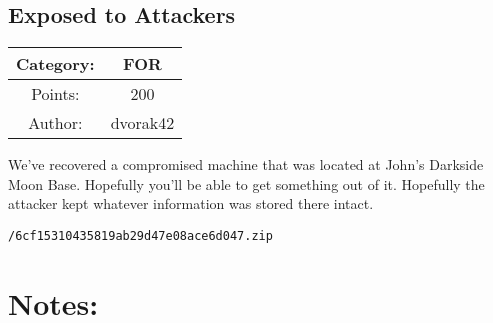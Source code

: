 \begin{center}
\section*{Exposed to Attackers}
{\large
\begin{tabular}{| c c |}
\hline
Category: & FOR\\\hline
Points: & 200\\\hline
Author: & dvorak42\\\hline
\end{tabular}
}
\end{center}
\vspace{0.5in}

{\large
We've recovered a compromised machine that was located at John's Darkside Moon Base. Hopefully you'll be able to get something out of it. Hopefully the attacker kept whatever information was stored there intact.
}
\vspace{0.25in}
\begin{center}
  {\Large\tt /6cf15310435819ab29d47e08ace6d047.zip}
\end{center}

\vspace{0.25in}
\section*{Notes:}
